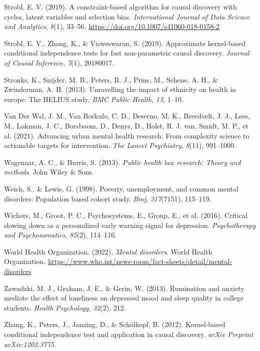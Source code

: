 \documentclass[
]{article}
\newlength{\cslhangindent}
\newenvironment{CSLReferences}[2] %
 {\begin{list}{}{%
  \setlength{\itemindent}{0pt}
  \setlength{\leftmargin}{0pt}
  \setlength{\parsep}{0pt}
  \ifodd #1
   \setlength{\leftmargin}{\cslhangindent}
   \setlength{\itemindent}{-1\cslhangindent}
  \fi
  \setlength{\itemsep}{#2\baselineskip}}}
 {\end{list}}
\begin{document}
\begin{CSLReferences}{1}{0}
Strobl, E. V. (2019). A constraint-based algorithm for causal discovery
with cycles, latent variables and selection bias. \emph{International
Journal of Data Science and Analytics}, \emph{8}(1), 33--56.
\url{https://doi.org/10.1007/s41060-018-0158-2}

Strobl, E. V., Zhang, K., \& Visweswaran, S. (2019). Approximate
kernel-based conditional independence tests for fast non-parametric
causal discovery. \emph{Journal of Causal Inference}, \emph{7}(1),
20180017.

Stronks, K., Snijder, M. B., Peters, R. J., Prins, M., Schene, A. H., \&
Zwinderman, A. H. (2013). Unravelling the impact of ethnicity on health
in europe: The HELIUS study. \emph{BMC Public Health}, \emph{13}, 1--10.

Van Der Wal, J. M., Van Borkulo, C. D., Deserno, M. K., Breedvelt, J.
J., Lees, M., Lokman, J. C., Borsboom, D., Denys, D., Holst, R. J. van,
Smidt, M. P., et al. (2021). Advancing urban mental health research:
From complexity science to actionable targets for intervention.
\emph{The Lancet Psychiatry}, \emph{8}(11), 991--1000.

Wagenaar, A. C., \& Burris, S. (2013). \emph{Public health law research:
Theory and methods}. John Wiley \& Sons.

Weich, S., \& Lewis, G. (1998). Poverty, unemployment, and common mental
disorders: Population based cohort study. \emph{Bmj}, \emph{317}(7151),
115--119.

Wichers, M., Groot, P. C., Psychosystems, E., Group, E., et al. (2016).
Critical slowing down as a personalized early warning signal for
depression. \emph{Psychotherapy and Psychosomatics}, \emph{85}(2),
114--116.

World Health Organization. (2022). \emph{Mental disorders}. World Health
Organization.
\url{https://www.who.int/news-room/fact-sheets/detail/mental-disorders}

Zawadzki, M. J., Graham, J. E., \& Gerin, W. (2013). Rumination and
anxiety mediate the effect of loneliness on depressed mood and sleep
quality in college students. \emph{Health Psychology}, \emph{32}(2),
212.

Zhang, K., Peters, J., Janzing, D., \& Schölkopf, B. (2012).
Kernel-based conditional independence test and application in causal
discovery. \emph{arXiv Preprint arXiv:1202.3775}.

\end{CSLReferences}
\end{document}
